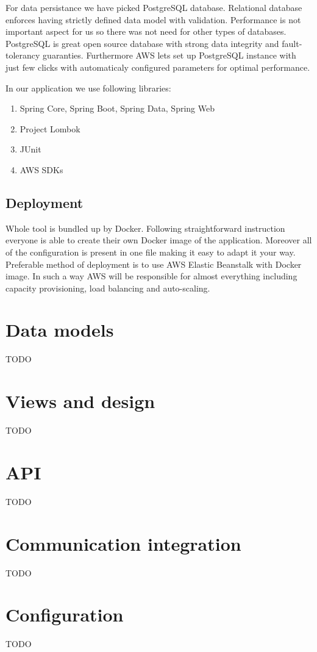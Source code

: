 \documentclass[licencjacka,en]{thesisclass}
\begin{document}
    For data persistance we have picked PostgreSQL database. Relational database enforces having strictly defined data model with validation. Performance is not important aspect for us so there was not need for other types of databases. PostgreSQL is great open source database with strong data integrity and fault-tolerancy guaranties. Furthermore AWS lets set up PostgreSQL instance with just few clicks with automaticaly configured parameters for optimal performance.

    In our application we use following libraries:
    \begin{enumerate}
        \item Spring Core, Spring Boot, Spring Data, Spring Web
        \item Project Lombok
        \item JUnit
        \item AWS SDKs
    \end{enumerate}

    \subsection{Deployment}

    Whole tool is bundled up by Docker. Following straightforward instruction everyone is able to create their own Docker image of the application. Moreover all of the configuration is present in one file making it easy to adapt it your way. Preferable method of deployment is to use AWS Elastic Beanstalk with Docker image. In such a way AWS will be responsible for almost everything including capacity provisioning, load balancing and auto-scaling.

    \section{Data models}
    TODO
    \section{Views and design}
    TODO
    \section{API}
    TODO
    \section{Communication integration}
    TODO
    \section{Configuration}
    TODO
\end{document}
